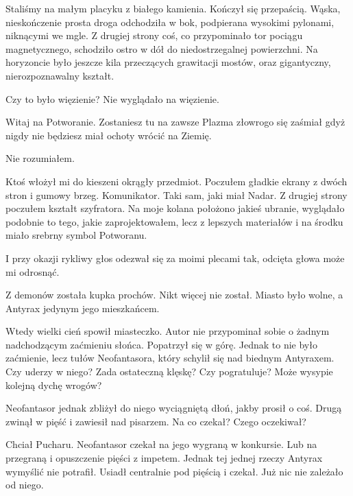 Staliśmy na małym placyku z białego kamienia. Kończył się przepaścią.
Wąska, nieskończenie prosta droga odchodziła w bok, podpierana wysokimi pylonami, niknącymi we mgle.
Z drugiej strony coś, co przypominało tor pociągu magnetycznego, schodziło ostro w dół do niedostrzegalnej powierzchni.
Na horyzoncie było jeszcze kila przeczących grawitacji mostów, oraz gigantyczny, nierozpoznawalny kształt.

Czy to było więzienie? Nie wyglądało na więzienie.
\begin{dialogue}
\ds{} Witaj na Potworanie. Zostaniesz tu na zawsze \dm{} Plazma złowrogo się zaśmiał \dm{} gdyż nigdy nie będziesz miał ochoty wrócić na Ziemię.
\end{dialogue}
Nie rozumiałem.

Ktoś włożył mi do kieszeni okrągły przedmiot.
Poczułem gładkie ekrany z dwóch stron i gumowy brzeg.
Komunikator. Taki sam, jaki miał Nadar.
Z drugiej strony poczułem kształt szyfratora.
Na moje kolana położono jakieś ubranie, wyglądało podobnie to tego, jakie zaprojektowałem, lecz z lepszych materiałów i na środku miało srebrny symbol Potworanu.

\begin{dialogue}
\ds{} I przy okazji \dm{} rykliwy głos odezwał się za moimi plecami \dm{} tak, odcięta głowa może mi odrosnąć.
\end{dialogue}

\divider{}

Z demonów została kupka prochów.
Nikt więcej nie został. Miasto było wolne, a Antyrax jedynym jego mieszkańcem.

Wtedy wielki cień spowił miasteczko.
Autor nie przypominał sobie o żadnym nadchodzącym zaćmieniu słońca.
Popatrzył się w górę.
Jednak to nie było zaćmienie, lecz tułów Neofantasora, który schylił się nad biednym Antyraxem.
Czy uderzy w niego? Zada ostateczną klęskę? Czy pogratuluje? Może wysypie kolejną dychę wrogów?

Neofantasor jednak zbliżył do niego wyciągniętą dłoń, jakby prosił o coś.
Drugą zwinął w pięść i zawiesił nad pisarzem.
Na co czekał? Czego oczekiwał?

Chciał Pucharu.
Neofantasor czekał na jego wygraną w konkursie. Lub na przegraną i opuszczenie pięści z impetem.
Jednak tej jednej rzeczy Antyrax wymyślić nie potrafił.
Usiadł centralnie pod pięścią i czekał. Już nic nie zależało od niego.


